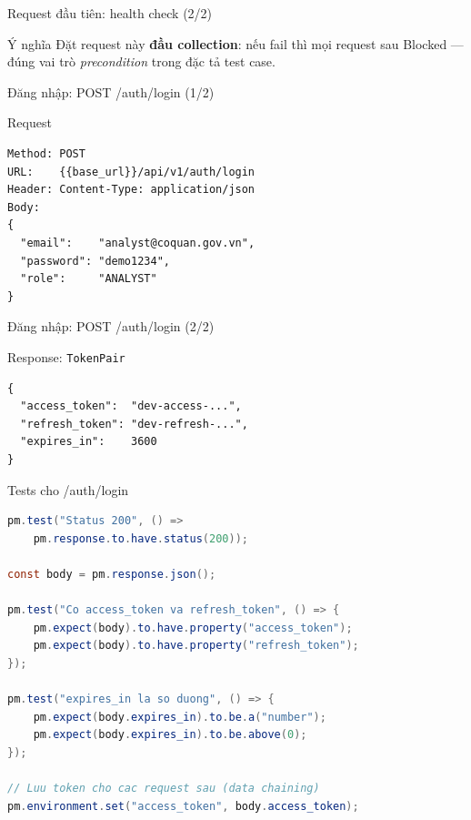 \documentclass[aspectratio=169,12pt]{beamer}
\begin{document}
\begin{frame}{Request đầu tiên: health check (2/2)}
  \begin{exampleblock}{Ý nghĩa}
    Đặt request này \textbf{đầu collection}: nếu fail thì mọi request sau
    Blocked --- đúng vai trò \emph{precondition} trong đặc tả test case.
  \end{exampleblock}
\end{frame}

\begin{frame}[fragile]{Đăng nhập: POST /auth/login (1/2)}
  \begin{block}{Request}
\begin{lstlisting}[language={}]
Method: POST
URL:    {{base_url}}/api/v1/auth/login
Header: Content-Type: application/json
Body:
{
  "email":    "analyst@coquan.gov.vn",
  "password": "demo1234",
  "role":     "ANALYST"
}
\end{lstlisting}
  \end{block}
\end{frame}

\begin{frame}[fragile]{Đăng nhập: POST /auth/login (2/2)}
  \begin{block}{Response: \texttt{TokenPair}}
\begin{lstlisting}[language={}]
{
  "access_token":  "dev-access-...",
  "refresh_token": "dev-refresh-...",
  "expires_in":    3600
}
\end{lstlisting}
  \end{block}
\end{frame}

\begin{frame}[fragile]{Tests cho /auth/login}
\begin{lstlisting}[language=Java,aboveskip=0pt,belowskip=0pt]
pm.test("Status 200", () =>
    pm.response.to.have.status(200));

const body = pm.response.json();

pm.test("Co access_token va refresh_token", () => {
    pm.expect(body).to.have.property("access_token");
    pm.expect(body).to.have.property("refresh_token");
});

pm.test("expires_in la so duong", () => {
    pm.expect(body.expires_in).to.be.a("number");
    pm.expect(body.expires_in).to.be.above(0);
});

// Luu token cho cac request sau (data chaining)
pm.environment.set("access_token", body.access_token);
\end{lstlisting}
\end{frame}
\end{document}
